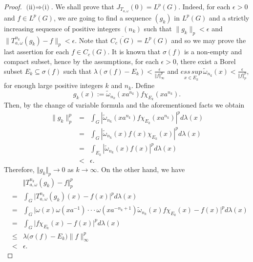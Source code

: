 \documentclass[10pt,a4paper]{amsart}
\begin{document}
\begin{proof}
$\mbox{(ii)}\Rightarrow \mbox{(i)}$. We shall prove
that $J_{T_{a,\omega}}(0)=L^p(G)$. Indeed, for each $\epsilon>0$ and
$f\in L^p(G)$, we are going to find a sequence
 $(g_k)$ in $L^p(G)$ and a strictly increasing sequence of positive integers
  $(n_k)$  such that $\|g_k
\|_p<\epsilon$ and
$\|T_{a,\omega}^{n_k}(g_k)-f\|_p<\epsilon$.
 Note that
$\overline{C_c(G)}=L^p(G)$ and so  we may prove the last assertion
for each $f \in C_c(G)$.
 It is known that
$\sigma(f)$ is a non-empty and compact subset, hence by the
assumptions, for each $\epsilon>0$,  there exist a Borel subset
$E_k\subseteq \sigma(f)$  such that
$\lambda(\sigma(f)-E_k)<\frac{\epsilon} { \Vert f\Vert_{\infty}^{p}}$ and
 $\underset{x\in E_{k}}{ess\,sup}\,
\tilde{\omega}_{n_k}(x)<\frac{\epsilon}{\Vert f\Vert_p^p}$,
 for enough large positive integers $k$ and $n_k$.
Define
$$g_k(x):=\tilde{\omega}_{n_k}(xa^{n_k})f\chi_{E_k}(xa^{n_k}).$$ Then,   by the
change of variable formula and the aforementioned facts we obtain
\begin{eqnarray*}
 \|g_k\|_p^p&=&\int_G|\tilde{\omega}_{n_k}(xa^{n_k})
 f\chi_{E_k}(xa^{n_k})|^p d\lambda(x) \\
  &=&\int_G|\tilde{\omega}_{n_k}(x)f(x)\chi_{E_k}(x)|^p d\lambda(x) \\
&=& \int_{E_k}|\tilde{\omega}_{n_k}(x)f(x)|^p d\lambda(x)\\
      &<& \epsilon.
  \end{eqnarray*}
Therefore, $\Vert g_{k}\Vert_p\to 0$ as $k\to \infty$. On the other
hand, we have
\begin{eqnarray*}
&&\Vert T_{a,\omega}^{n_k}(g_k) - f\Vert_p^p
\\&=&
\int_G \vert T_{a,\omega}^{n_k}(g_k)(x) -f(x)\vert^p d\lambda(x)
\\&=&
\int_{G} \vert
\omega(x)\omega(xa^{-1})\cdot\cdot\cdot\omega(xa^{-n_k+1})\tilde{\omega}_{n_k}(x)
f\chi_{E_k}(x)-f(x)\vert^p d\lambda(x)\\
&=&\int_{G} \vert f\chi_{E_k}(x)-f(x)\vert^p d\lambda(x)\\ &\leq&
\lambda\big(\sigma(f)-E_k\big) \|f\|_{\infty}^p\\&<&\epsilon.
\end{eqnarray*}
\end{proof}
\end{document}
